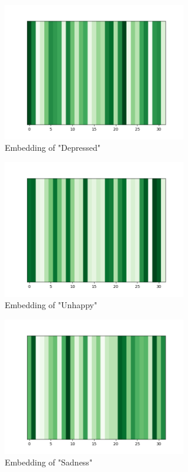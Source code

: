 \documentclass[11pt]{article}
\begin{document}
\begin{figure}
    \begin{center}
    \includegraphics[width=8cm]{depressed.png}
    \caption{Embedding of "Depressed"}
    \label{fig:height}
    \end{center}
\end{figure}

\begin{figure}
    \begin{center}
    \includegraphics[width=8cm]{unhappy.png}
    \caption{Embedding of "Unhappy"}
    \label{fig:height}
    \end{center}
\end{figure}

\begin{figure}
    \begin{center}
    \includegraphics[width=8cm]{sadness.png}
    \caption{Embedding of "Sadness"}
    \label{fig:height}
    \end{center}
\end{figure}
\end{document}

